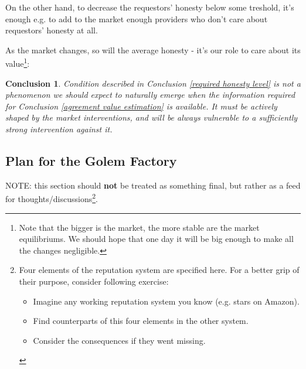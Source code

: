 \documentclass{article}
\newtheorem{conclusion}{Conclusion}[section]
\begin{document}
On the other hand, to decrease the requestors' honesty below some treshold, it's enough e.g. to add to the market enough providers who don't care about
requestors' honesty at all.

As the market changes, so will the average honesty - it's our role to care about its value\footnote{
    Note that the bigger is the market, the more stable are the market equilibriums. We should hope that one day it will be big enough
    to make all the changes negligible.}:

\begin{conclusion}
Condition described in Conclusion \ref{required honesty level} is not a phenomenon we should expect to naturally emerge when the information
required for Conclusion \ref{agreement value estimation} is available. It must be actively shaped by the market interventions,
and will be always vulnerable to a sufficiently strong intervention against it.
\end{conclusion}

\subsection{Plan for the Golem Factory}

NOTE: this section should \textbf{not} be treated as something final, but rather as a feed for thoughts/discussions\footnote{
    Four elements of the reputation system are specified here. For a better grip of their purpose, consider following exercise:
    \begin{itemize}
        \item Imagine any working reputation system you know (e.g. stars on Amazon).
        \item Find counterparts of this four elements in the other system.
        \item Consider the consequences if they went missing.
    \end{itemize}
}.
\end{document}
